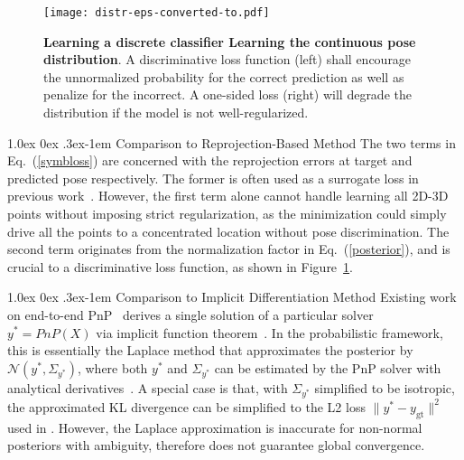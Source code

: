 \documentclass[10pt,twocolumn,letterpaper]{article}
\makeatletter
\renewcommand{\paragraph}{
  \@startsection{paragraph}{4}
  {\z@}{1.0ex \@plus 0ex \@minus .3ex}{-1em}
  {\normalfont\normalsize\bfseries}
}
\makeatother
\begin{document}
\begin{figure}[t]
\begin{center}
    \texttt{[image: distr-eps-converted-to.pdf]}
\end{center}
\vspace{-1ex}
\caption{\textbf{Learning a discrete classifier \vs Learning the continuous pose distribution}. A discriminative loss function (left) shall encourage the unnormalized probability for the correct prediction as well as penalize for the incorrect. 
A one-sided loss (right) will degrade the distribution if the model is not well-regularized.}
\label{fig:distr}
\end{figure}

\paragraph{Comparison to Reprojection-Based Method}
The two terms in Eq.~(\ref{symbloss}) are concerned with the reprojection errors at target and predicted pose respectively. The former is often used as a surrogate loss in previous work~\cite{BPnP, dsac++, monorun}. However, the first term alone cannot handle learning all 2D-3D points without imposing strict regularization, as the minimization could simply drive all the points to a concentrated location without pose discrimination. The second term originates from the normalization factor in Eq.~(\ref{posterior}), and is crucial to a discriminative loss function, as shown in Figure~\ref{fig:distr}.

\paragraph{Comparison to Implicit Differentiation Method} 
Existing work on end-to-end PnP~\cite{BPnP, blindpnp}
derives a single solution of a particular solver $y^\ast = \mathit{PnP}(X)$ via implicit function theorem~\cite{declarative}. In the probabilistic framework, this is essentially the Laplace method that approximates the posterior by $\mathcal{N}(y^\ast, \Sigma_{y^\ast})$, where both $y^\ast$ and $\Sigma_{y^\ast}$ can be estimated by the PnP solver with analytical derivatives~\cite{monorun}. 
A special case is that, with $\Sigma_{y^\ast}$ simplified to be isotropic, the approximated KL divergence can be simplified to the L2 loss $\|y^\ast - y_\text{gt}\|^2$ used in \cite{blindpnp}. However, the Laplace approximation is inaccurate for non-normal posteriors with ambiguity, therefore does not guarantee global convergence.
\end{document}
